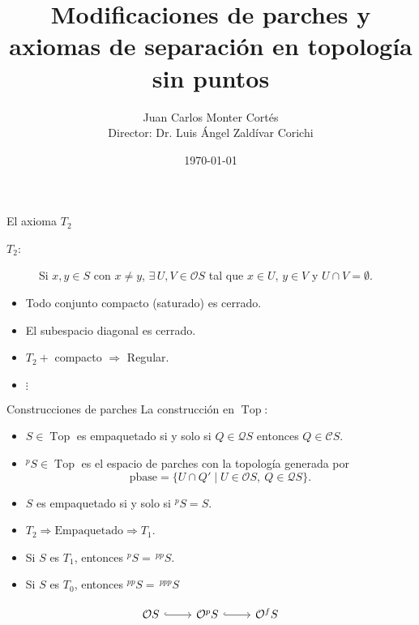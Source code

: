 \documentclass[compress,12pt]{beamer}
\title{Modificaciones de parches y axiomas de separación en topología sin puntos}
\date{\today}
\author{Juan Carlos Monter Cortés \\ Director: Dr. Luis Ángel Zaldívar Corichi}
\institute{Universidad de Guadalajara}
\DeclareMathOperator{\Top}{Top}
\begin{document}
\frame[plain]{\titlepage}


\begin{frame}{El axioma $T_2$}
\begin{description}
    \item[$T_2$:] Si $x, y\in S$ con $x\neq y$, $\exists\, U, V\in \mathcal{O}S$ tal que $x\in U$, $y\in V$ y $U\cap V=\emptyset$.
\end{description}


\begin{itemize}
    \item<3-> \alert<7->{Todo conjunto compacto (saturado) es cerrado.}
    \item<4-> El subespacio diagonal es cerrado.
    \item<5-> $T_2+$ compacto $\Rightarrow$ Regular.
    \item<6-> $\vdots$
\end{itemize}    
\end{frame}

\begin{frame}[fragile]{Construcciones de parches}
La construcción en $\Top$:
\begin{itemize}
    \item<2-> $S\in \Top$ es empaquetado si y solo si $Q\in \mathcal{Q}S$ entonces $Q\in \mathcal{C}S$. 
    \item<3-> $^pS\in \Top$ es el espacio de parches con la topología generada por 
    \[
    \mbox{pbase} = \{U\cap Q'\mid U\in \mathcal{O}S,\ Q\in \mathcal{Q}S\}.
    \]
    \item<4-> $S$ es empaquetado si y solo si $^pS = S$.
    \item<5-> $T_2 \Rightarrow \mbox{Empaquetado} \Rightarrow T_1$.
    \item<6-> Si $S$ es $T_1$, entonces $^pS = \,^{pp}S$.
    \item<7-> Si $S$ es $T_0$, entonces $^{pp}S = \,^{ppp}S$
\end{itemize}
\[
\begin{tikzcd}
	{\mathcal{O}S} & {\mathcal{O}^pS} & {\mathcal{O}^fS}
	\arrow[hook, from=1-1, to=1-2]
	\arrow[hook, from=1-2, to=1-3]
\end{tikzcd}
\]
\end{frame}
\end{document}
